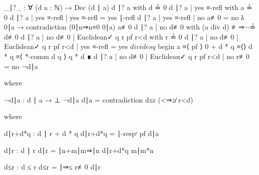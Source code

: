 \documentclass[./Thesis.tex]{subfiles}
\begin{document}
\begin{code}
  _∣?_ : ∀ (d a : ℕ) → Dec (d ∣ a)
  d ∣? a with d ≟ 0
  d ∣? a | yes ≡-refl with a ≟ 0
  d ∣? a | yes ≡-refl | yes ≡-refl = yes ∣-refl
  d ∣? a | yes ≡-refl | no a≢0 = no λ 0∣a → contradiction (0∣n⇒n≡0 0∣a) a≢0
  d ∣? a | no d≢0 with (a div d) {≢⇒¬≟ d≢0}
  d ∣? a | no d≢0 | Euclidean✓ q r pf r<d with r ≟ 0
  d ∣? a | no d≢0 | Euclidean✓ q r pf r<d | yes ≡-refl =
    yes $ divides q $ begin
      a ≡⟨ pf ⟩
      0 + d * q ≡⟨⟩
      d * q ≡⟨ *-comm d q ⟩
      q * d ∎
  d ∣? a | no d≢0 | Euclidean✓ q r pf r<d | no r≢0 = no ¬d∣a
\end{code}
\begin{code}[hide]
    where
\end{code}
\begin{code}
    ¬d∣a : d ∣ a → ⊥
    ¬d∣a d∣a = contradiction d≤r (<⇒≱ r<d)
\end{code}
\begin{code}[hide]
      where
\end{code}
\begin{code}
      d∣r+d*q : d ∣ r + d * q
      d∣r+d*q = ∣-respʳ pf d∣a
\end{code}
\begin{code}
      d∣r : d ∣ r
      d∣r = ∣n+m∣m⇒∣n d∣r+d*q m∣m*n
\end{code}
\begin{code}
      d≤r : d ≤ r
      d≤r = ∣⇒≤ r≢0 d∣r
\end{code}
\end{document}
